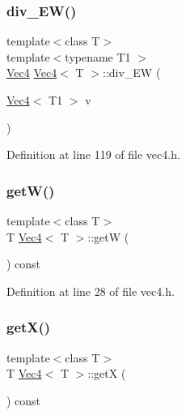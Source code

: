 \subsubsection{\texorpdfstring{div\_EW()}{div\_EW()}\hspace{0.1cm}{\footnotesize\ttfamily [2/2]}}
{\footnotesize\ttfamily template$<$class T$>$ \\
template$<$typename T1 $>$ \\
\mbox{\hyperlink{class_vec4}{Vec4}} \mbox{\hyperlink{class_vec4}{Vec4}}$<$ T $>$\+::div\+\_\+\+EW (\begin{DoxyParamCaption}\item[{\mbox{\hyperlink{class_vec4}{Vec4}}$<$ T1 $>$}]{v }\end{DoxyParamCaption})\hspace{0.3cm}{\ttfamily [inline]}}



Definition at line 119 of file vec4.\+h.

\mbox{\label{class_vec4_a2521cd3acaff1d2f08db0d0cbf99b41d}} 
\subsubsection{\texorpdfstring{getW()}{getW()}}
{\footnotesize\ttfamily template$<$class T$>$ \\
T \mbox{\hyperlink{class_vec4}{Vec4}}$<$ T $>$\+::getW (\begin{DoxyParamCaption}{ }\end{DoxyParamCaption}) const\hspace{0.3cm}{\ttfamily [inline]}}



Definition at line 28 of file vec4.\+h.

\mbox{\label{class_vec4_ac99f7d2425b140e008a4d3eb3c6ac279}} 
\subsubsection{\texorpdfstring{getX()}{getX()}}
{\footnotesize\ttfamily template$<$class T$>$ \\
T \mbox{\hyperlink{class_vec4}{Vec4}}$<$ T $>$\+::getX (\begin{DoxyParamCaption}{ }\end{DoxyParamCaption}) const\hspace{0.3cm}{\ttfamily [inline]}}



